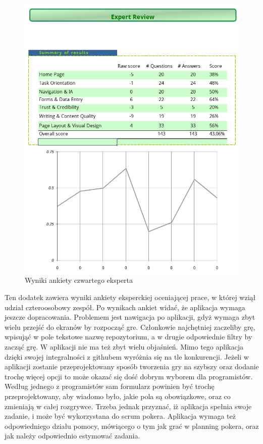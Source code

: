 \documentclass[inzynier,druk]{dyplom}
\begin{document}
\begin{figure}
	\centering\includegraphics[width=\textwidth]{img/ankieta4}
	\caption{Wyniki ankiety czwartego eksperta}\label{rys:ankieta4}%
\end{figure}

Ten dodatek zawiera wyniki ankiety eksperckiej oceniającej prace,
w której wziął udział czteroosobowy zespół.
Po wynikach ankiet widać, że aplikacja wymaga jeszcze dopracowania.
Problemem jest nawigacja po aplikacji, gdyż wymaga zbyt wielu przejść do ekranów by rozpocząć gre.
Członkowie najchętniej zaczeliby grę, wpisująć w pole tekstowe nazwę repozytorium,
a w drugie odpowiednie filtry by zacząć grę.
W aplikacji nie ma też zbyt wielu objaśnień.
Mimo tego aplikacja dzięki swojej integralności z githubem wyróżnia się na tle konkurencji.
Jeżeli w aplikacji zostanie przeprojektowany sposób tworzenia gry na szybszy
oraz dodanie trochę więcej opcji to może okazać się dość dobrym wyborem dla programistów.
Według jednego z programistów sam formularz powinien być trochę przeprojektowany,
aby wiadomo było, jakie pola są obowiązkowe, oraz co zmieniają w całej rozgrywce.
Trzeba jednak przyznać, iż aplikacja spełnia swoje zadanie, i może być wykorzystana do scrum pokera.
Aplikacja wymaga też odpowiedniego działu pomocy, mówiącego o tym jak grać w planning pokera,
oraz jak należy odpowiednio estymować zadania.



\end{document}
